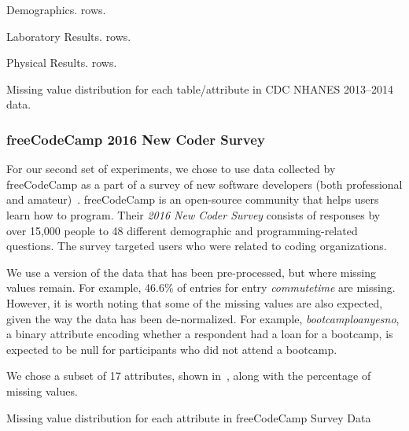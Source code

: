 \begin{table}
  \centering
  \begin{subtable}{0.5\textwidth}
    \centering
    
    \caption{Demographics. \demorows{} rows.}
  \end{subtable}
  \par\medskip
  \begin{subtable}{0.5\textwidth}
    \centering
    
    \caption{Laboratory Results. \labexrows{} rows.}
  \end{subtable}
  \par\medskip  
  \begin{subtable}{0.5\textwidth}
    \centering
    
    \caption{Physical Results. \labexrows{} rows.}
  \end{subtable}
  \par\medskip  
  \caption{Missing value distribution for each table/attribute in CDC NHANES 2013--2014 data.}\label{table:nhanes-description} 
\end{table}

\subsubsection{freeCodeCamp 2016 New Coder Survey}
For our second set of experiments, we chose to use data collected
by freeCodeCamp as a part of a survey of new software developers
(both professional and amateur)~\cite{fcc-data}. freeCodeCamp is an open-source
community that helps users learn how to program. Their \textit{2016 New Coder Survey} consists of responses by over 15,000 people to 48 different
demographic and programming-related questions.
The survey targeted users who were related to coding organizations.

We use a version of the data that has been pre-processed, but where missing values remain.
For example, 46.6\% of entries for entry \textit{commutetime} are missing. However, it is worth noting that some of the missing values
are also expected, given the way the data has been de-normalized. For example, \textit{bootcamploanyesno}, a binary attribute encoding
whether a respondent had a loan for a bootcamp, is expected to be null for participants who did not attend a bootcamp.

We chose a subset of 17 attributes, shown in~, along with the percentage of missing values.

\begin{table}
  \centering
  
  \caption{Missing value distribution for each attribute in freeCodeCamp Survey Data}\label{table:fcc-description} 
\end{table}

